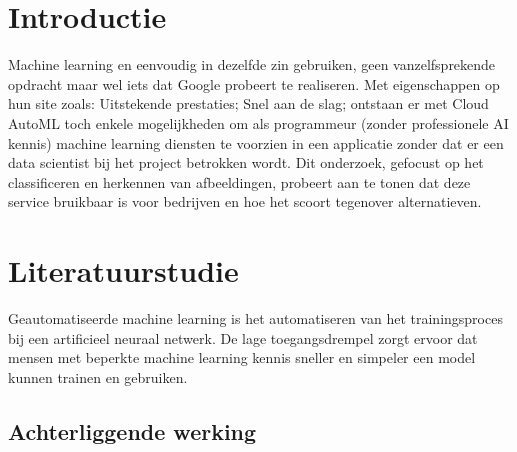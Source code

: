 
\section{Introductie} %
\label{sec:introductie}

Machine learning en eenvoudig in dezelfde zin gebruiken, geen vanzelfsprekende opdracht maar wel iets dat Google probeert te realiseren. Met eigenschappen op hun site \autocite{Google2019} zoals: Uitstekende prestaties; Snel aan de slag; ontstaan er met Cloud AutoML toch enkele mogelijkheden om als programmeur (zonder professionele AI kennis) machine learning diensten te voorzien in een applicatie zonder dat er een data scientist bij het project betrokken wordt. Dit onderzoek, gefocust op het classificeren en herkennen van afbeeldingen, probeert aan te tonen dat deze service bruikbaar is voor bedrijven en hoe het scoort tegenover alternatieven.


\section{Literatuurstudie}
\label{sec:literatuurstudie}


Geautomatiseerde machine learning is het automatiseren van het trainingsproces bij een artificieel neuraal netwerk. De lage toegangsdrempel zorgt ervoor dat mensen met beperkte machine learning kennis sneller en simpeler een model kunnen trainen en gebruiken.

\subsection{Achterliggende werking}

